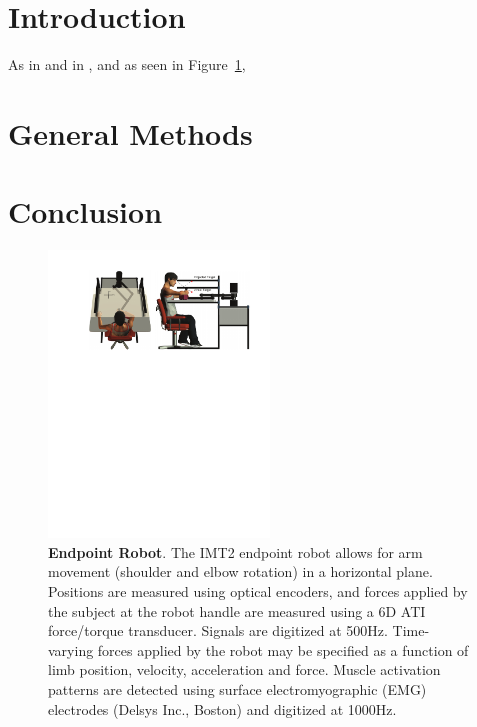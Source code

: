 \documentclass[twocolumn,11pt,letterpaper]{article}
\begin{document}
  
\section*{Introduction}

As in \cite{mattar2005motor} and in \cite{hodgkin1952propagation},
and as seen in Figure~\ref{fig:robot}, \lipsum[1-7]

\section*{General Methods}

\lipsum[1-6]

\section*{Conclusion}

\lipsum[1]

\newpage
\onecolumn




\newpage
\clearpage
\begin{figure}[H]
	\centering
        \includegraphics[height=3in]{robot_imt.pdf}
        \caption{\textbf{Endpoint Robot}. The IMT2 endpoint robot
          allows for arm movement (shoulder and elbow rotation) in a
          horizontal plane. Positions are measured using optical
          encoders, and forces applied by the subject at the robot
          handle are measured using a 6D ATI force/torque
          transducer. Signals are digitized at 500Hz. Time-varying
          forces applied by the robot may be specified as a function
          of limb position, velocity, acceleration and force. Muscle
          activation patterns are detected using surface
          electromyographic (EMG) electrodes (Delsys Inc., Boston) and
          digitized at 1000Hz.}
 \label{fig:robot}
\end{figure}


\end{document}
